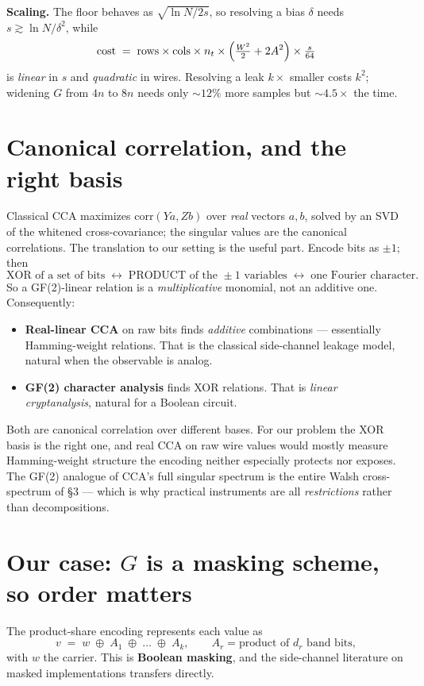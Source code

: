 \documentclass[11pt]{article}
\newcommand{\xor}{\oplus}
\begin{document}
\textbf{Scaling.} The floor behaves as $\sqrt{\ln N / 2s}$, so resolving a bias
$\delta$ needs $s \gtrsim \ln N/\delta^2$, while
\[
  \text{cost} \;=\; \text{rows} \times \text{cols} \times n_t \times
  \Bigl(\tfrac{W^2}{2} + 2A^2\Bigr) \times \tfrac{s}{64}
\]
is \emph{linear} in $s$ and \emph{quadratic} in wires. Resolving a leak $k\times$
smaller costs $k^2$; widening $G$ from $4n$ to $8n$ needs only ${\sim}12\%$ more
samples but ${\sim}4.5\times$ the time.

\section{Canonical correlation, and the right basis}

Classical CCA maximizes $\mathrm{corr}(Ya, Zb)$ over \emph{real} vectors $a,b$,
solved by an SVD of the whitened cross-covariance; the singular values are the
canonical correlations. The translation to our setting is the useful part.
Encode bits as $\pm 1$; then
\[
  \text{XOR of a set of bits} \;\longleftrightarrow\; \text{PRODUCT of the } \pm 1
  \text{ variables} \;\longleftrightarrow\; \text{one Fourier character}.
\]
So a GF(2)-linear relation is a \emph{multiplicative} monomial, not an additive
one. Consequently:
\begin{itemize}
  \item \textbf{Real-linear CCA} on raw bits finds \emph{additive} combinations
        --- essentially Hamming-weight relations. That is the classical
        side-channel leakage model, natural when the observable is analog.
  \item \textbf{GF(2) character analysis} finds XOR relations. That is
        \emph{linear cryptanalysis}, natural for a Boolean circuit.
\end{itemize}
Both are canonical correlation over different bases. For our problem the
XOR basis is the right one, and real CCA on raw wire values would mostly measure
Hamming-weight structure the encoding neither especially protects nor exposes.
The GF(2) analogue of CCA's full singular spectrum is the entire Walsh
cross-spectrum of \S3 --- which is why practical instruments are all
\emph{restrictions} rather than decompositions.

\section{Our case: $G$ is a masking scheme, so order matters}

The product-share encoding represents each value as
\[
  v \;=\; w \;\xor\; A_1 \;\xor\; \dots \;\xor\; A_k, \qquad
  A_r = \text{product of } d_r \text{ band bits},
\]
with $w$ the carrier. This is \textbf{Boolean masking}, and the side-channel
literature on masked implementations transfers directly.
\end{document}
